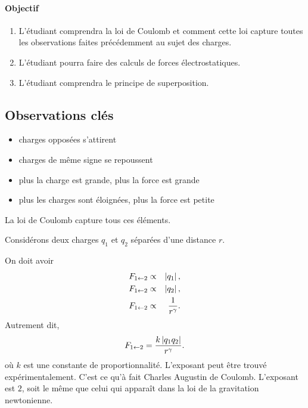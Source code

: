
\paragraph{Objectif}

\begin{enumerate}
  \item L'étudiant comprendra la loi de Coulomb et comment cette loi capture
    toutes les observations faites précédemment au sujet des charges.
  \item L'étudiant pourra faire des calculs de forces électrostatiques.
  \item L'étudiant comprendra le principe de superposition.
\end{enumerate}


\subsection*{Observations clés}
  \begin{itemize}
    \item charges opposées s'attirent
    \item charges de même signe se repoussent
    \item plus la charge est grande, plus la force est grande
    \item plus les charges sont éloignées, plus la force est petite
  \end{itemize}

  La loi de Coulomb capture tous ces éléments.

  Considérons deux charges $q_1$ et $q_2$ séparées d'une distance $r$.

    \begin{center}
    \end{center}
  On doit avoir
  \begin{eqnarray*}
    F_{1 \leftarrow 2} & \propto & \left| q_1 \right|, \\
    F_{1 \leftarrow 2} & \propto & \left| q_2 \right|, \\
    F_{1 \leftarrow 2} & \propto & \frac{1}{r^\gamma}.
  \end{eqnarray*}
  Autrement dit,
  $$
    F_{1 \leftarrow 2} = \frac{k\left| q_1 q_2 \right|}{r^\gamma}.
  $$
  où $k$ est une constante de proportionnalité. L'exposant peut être trouvé
  expérimentalement. C'est ce qu'à fait Charles Augustin de Coulomb. L'exposant
  est $2$, soit le même que celui qui apparaît dans la loi de la gravitation
  newtonienne.

